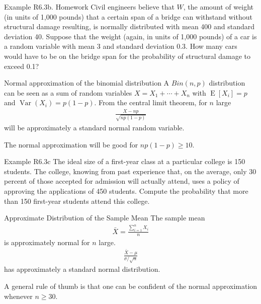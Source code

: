 \documentclass{beamer}
\newcommand{\E}[1]{\operatorname{E}\left[#1\right]}
\newcommand{\Var}[1]{\operatorname{Var}\left(#1\right)}
\begin{document}
\begin{frame}[t,shrink=15]{Example R6.3b. Homework}
  Civil engineers believe that $W$, the amount of weight (in units of 1,000
  pounds) that a certain span of a bridge can withstand without structural
  damage resulting, is normally distributed with mean 400 and standard deviation
  40. Suppose that the weight (again, in units of 1,000 pounds) of a car is a
  random variable with mean 3 and standard deviation 0.3. How many cars would
  have to be on the bridge span for the probability of structural damage to
  exceed 0.1?
\end{frame}

\begin{frame}{Normal approximation of the binomial distribution}
  A $Bin(n,p)$ distribution can be seen as a sum of random variables
  $X=X_1+\cdots+X_n$ with $\E{X_i} = p$ and $\Var{X_i} = p(1-p)$. From the
  central limit theorem, for $n$ large
  \begin{align*}
    \frac{X-np}{\sqrt{np(1-p)}}
  \end{align*}
  will be approximately a standard normal random variable.

  The normal approximation will be good for $np(1-p)\geq 10$.
\end{frame}

\begin{frame}[t,shrink=10]{Example R6.3c}
  The ideal size of a first-year class at a particular college is 150 students.
  The college, knowing from past experience that, on the average, only 30
  percent of those accepted for admission will actually attend, uses a policy of
  approving the applications of 450 students. Compute the probability that more
  than 150 first-year students attend this college.
\end{frame}

\begin{frame}{Approximate Distribution of the Sample Mean}
  The sample mean
  \begin{align*}
    \bar{X}=\frac{\sum_{i=1}^n X_i}{n}
  \end{align*}
  is approximately normal for $n$ large.
  \begin{align*}
    \frac{\bar{X}-\mu}{\sigma/\sqrt{n}}
  \end{align*}
  has approximately a standard normal distribution.

  A general rule of thumb is that one can be confident of the normal
  approximation whenever $n\geq 30$.
\end{frame}
\end{document}
